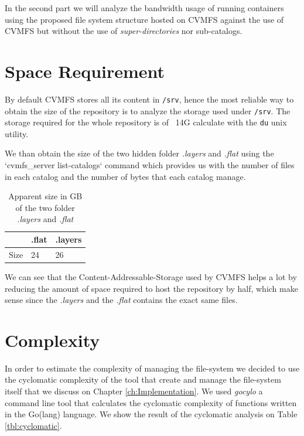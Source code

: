 In the second part we will analyze the bandwidth usage of running containers
using the proposed file system structure hosted on CVMFS against the use of CVMFS but without the use of \textit{super-directories} nor sub-catalogs.

\section{Space Requirement}

By default CVMFS stores all its content in \texttt{/srv}, hence the most
reliable way to obtain the size of the repository is to analyze the storage
used under \texttt{/srv}. The storage required for the whole repository is of
~14G calculate with the \texttt{du} unix utility.

We than obtain the size of the two hidden folder \textit{.layers} and
\textit{.flat} using the `cvmfs\_server list-catalogs` command which provides us
with the number of files in each catalog and the number of bytes that each
catalog manage.

\begin{table}[]
\begin{tabular}{|l|ll|}
\hline
     & .flat & .layers \\ \hline
Size & 24    & 26      \\ \hline
\end{tabular}
\caption{Apparent size in GB of the two folder \textit{.layers} and \textit{.flat}}
\label{tab:size-of-repo}
\end{table}

We can see that the Content-Addressable-Storage used by CVMFS helps a lot by
reducing the amount of space required to host the repository by half, which
make sense since the \textit{.layers} and the \textit{.flat} contains the exact
same files.

\section{Complexity}

In order to estimate the complexity of managing the file-system we decided to
use the cyclomatic complexity of the tool that create and manage the
file-system itself that we discuss on Chapter \ref{ch:Implementation}. We used
\textit{gocylo} \cite{gocyclo} a command line tool that calculates the
cyclomatic complexity of functions written in the Go(lang) language. We show
the result of the cyclomatic analysis on Table \ref{tbl:cyclomatic}.

